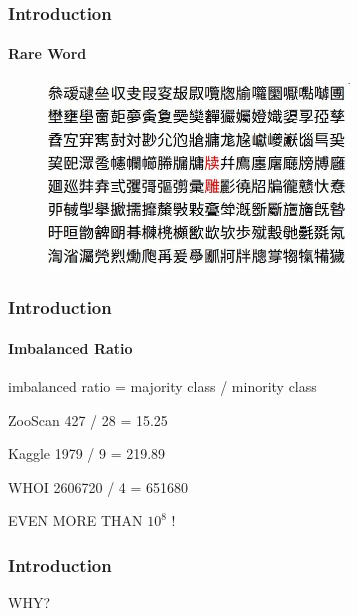 \documentclass[11 pt,t]{beamer}
\begin{document}
\begin{frame}
\frametitle{Introduction}
\framesubtitle{Rare Word}
\begin{minipage}[t]{\linewidth}\centering
\begin{figure}
   \includegraphics[width=8cm]{shengpizi1}
\end{figure}
\end{minipage}
\end{frame}

\begin{frame}
\frametitle{Introduction}
\framesubtitle{Imbalanced Ratio}
imbalanced ratio = majority class / minority class
\begin{block}{ZooScan}
   427 / 28 = 15.25
\end{block}
\begin{exampleblock}{Kaggle}
   1979 / 9 = 219.89
\end{exampleblock}
\begin{alertblock}{WHOI}
   2606720 / 4 = 651680
\end{alertblock}
{\textcolor{tangocolordarkchameleon}{EVEN MORE THAN $10^{8}$ !} }
\end{frame}

\begin{frame}
\frametitle{Introduction}
\begin{center}%

\Huge{WHY?}

\end{center}
\end{frame}
\end{document}
